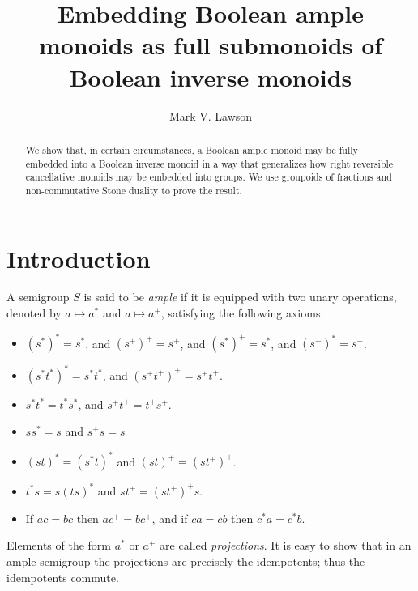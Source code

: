 \documentclass[a4paper]{amsart}
\title[An embedding theorem]{Embedding Boolean ample monoids as full submonoids of Boolean inverse monoids}
\author{Mark V. Lawson}
\begin{document}


\begin{abstract}
We show that, in certain circumstances, a Boolean ample monoid may be fully embedded into a Boolean inverse monoid
in a way that generalizes how right reversible cancellative monoids may be embedded into groups.
We use groupoids of fractions and non-commutative Stone duality to prove the result.
\end{abstract}
\maketitle



\section{Introduction}

A semigroup $S$ is said to be {\em ample} if it is equipped with two unary operations, denoted by $a \mapsto a^{\ast}$ and $a \mapsto a^{+}$,
satisfying the following axioms:
\begin{itemize}
\item[{\rm (A1).}] $(s^{\ast})^{\ast} = s^{\ast}$, and $(s^{+})^{+} = s^{+}$, and $(s^{\ast})^{+} = s^{\ast}$, and $(s^{+})^{\ast} = s^{+}$. 
\item[{\rm (A2).}] $(s^{\ast}t^{\ast})^{\ast} = s^{\ast}t^{\ast}$, and $(s^{+}t^{+})^{+} = s^{+}t^{+}$.
\item[{\rm (A3).}] $s^{\ast}t^{\ast} = t^{\ast}s^{\ast}$, and $s^{+}t^{+} = t^{+}s^{+}$.
\item[{\rm (A4).}] $ss^{\ast} = s$ and $s^{+}s = s$
\item[{\rm (A5).}] $(st)^{\ast} = (s^{\ast}t)^{\ast}$ and $(st)^{+} = (st^{+})^{+}$.
\item[{\rm (A6).}] $t^{\ast}s = s(ts)^{\ast}$ and $st^{+} = (st^{+})^{+}s$.
\item[{\rm (A7).}] If $ac = bc$ then $ac^{+} = bc^{+}$, and if $ca = cb$ then $c^{\ast}a = c^{\ast}b$.
\end{itemize}
Elements of the form $a^{\ast}$ or $a^{+}$ are called {\em projections}.
It is easy to show that in an ample semigroup the projections are precisely the idempotents;
thus the idempotents commute.
\end{document}
